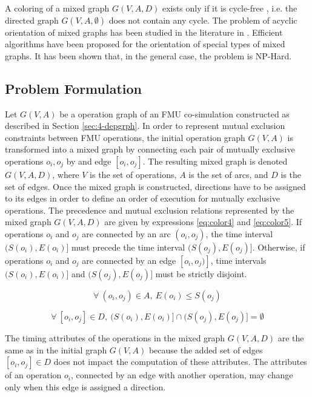 A coloring of a mixed graph $G(V,A,D)$ exists only if it is cycle-free \cite{ries:2007}, i.e. the directed graph $G(V,A,\emptyset)$ does not contain any cycle. The problem of acyclic orientation of mixed graphs has been studied in the literature in \cite{andreev:2000,sotskov:2002,al-anzi:2006}. Efficient algorithms have been proposed for the orientation of special types of mixed graphs. It has been shown that, in the general case, the problem is NP-Hard.

\subsection{Problem Formulation}

Let $G(V,A)$ be a operation graph of an FMU co-simulation constructed as described in Section \ref{sec:4-depgrph}. In order to represent mutual exclusion constraints between FMU operations, the initial operation graph $G(V,A)$ is transformed into a mixed graph by connecting each pair of mutually exclusive operations $o_i, o_j$ by and edge $[o_i, o_j]$. The resulting mixed graph is denoted $G(V,A,D)$, where $V$ is the set of operations, $A$ is the set of arcs, and $D$ is the set of edges. Once the mixed graph is constructed, directions have to be assigned to its edges in order to define an order of execution for mutually exclusive operations. The precedence and mutual exclusion relations represented by the mixed graph $G(V,A,D)$ are given by expressions \ref{eq:color4} and \ref{eq:color5}. If operations $o_i$ and $o_j$ are connected by an arc $(o_i,o_j)$, the time interval $(S(o_i), E(o_i)]$ must precede the time interval $(S(o_j), E(o_j)]$. Otherwise, if operations $o_i$ and $o_j$ are connected by an edge $[o_i,o_j)]$, time intervals $(S(o_i), E(o_i)]$ and $(S(o_j), E(o_j)]$ must be strictly disjoint.

\begin{equation}
\forall\ (o_i,o_j) \in A,\ E(o_i) \leq S(o_j)
\label{eq:color4}
\end{equation}

\begin{equation}
\forall\ [o_i,o_j] \in D,\  (S(o_i), E(o_i)] \cap (S(o_j), E(o_j)] = \emptyset
\label{eq:color5}
\end{equation}

The timing attributes of the operations in the mixed graph $G(V,A,D)$ are the same as in the initial graph $G(V,A)$ because the added set of edges $[o_i, o_j] \in D$ does not impact the computation of these attributes. The attributes of an operation $o_i$, connected by an edge with another operation, may change only when this edge is assigned a direction. 

